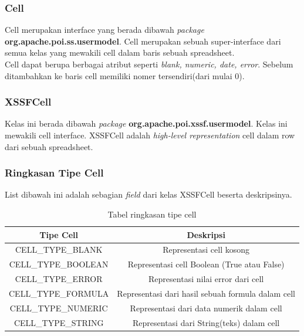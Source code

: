 \subsubsection{Cell}
\label{subs:Cell}
Cell merupakan interface yang berada dibawah \textit{package} \textbf{org.apache.poi.ss.usermodel}. Cell merupakan sebuah super-interface dari semua kelas yang mewakili cell dalam baris sebuah spreadsheet.\\

Cell dapat berupa berbagai atribut seperti \textit{blank, numeric, date, error}. Sebelum ditambahkan ke baris cell memiliki nomer tersendiri(dari mulai 0).\cite{apachepoi2}

\subsubsection{XSSFCell}
\label{subs:XSSFCell}  
Kelas ini berada dibawah \textit{package} \textbf{org.apache.poi.xssf.usermodel}. Kelas ini mewakili cell interface. XSSFCell adalah \textit{high-level representation} cell dalam row dari sebuah spreadsheet.\cite{apachepoi2}

\subsubsection{Ringkasan Tipe Cell}
\label{subs:Ringkasan_Tipe_Cell}
List dibawah ini adalah sebagian \textit{field} dari kelas XSSFCell beserta deskripsinya.
\begin{table}[H]
		\centering
		\caption{Tabel ringkasan tipe cell}
		\label{tab:ringkasan_tipe_cell}
	\begin{tabular}{|c|c|}
		\hline
		\textbf{Tipe Cell} & \textbf{Deskripsi} \\ \hline \hline
		CELL\_TYPE\_BLANK & Representasi cell kosong\\ \hline 
		CELL\_TYPE\_BOOLEAN &	Representasi cell Boolean (True atau False)\\ \hline 
		CELL\_TYPE\_ERROR & Representasi nilai error dari cell\\ \hline
		CELL\_TYPE\_FORMULA	&	Representasi dari hasil sebuah formula dalam cell\\ \hline
		CELL\_TYPE\_NUMERIC	&	Representasi dari data numerik dalam cell\\ \hline
		CELL\_TYPE\_STRING	&	Representasi dari String(teks) dalam cell\\ \hline
	\end{tabular}
\end{table}
	
